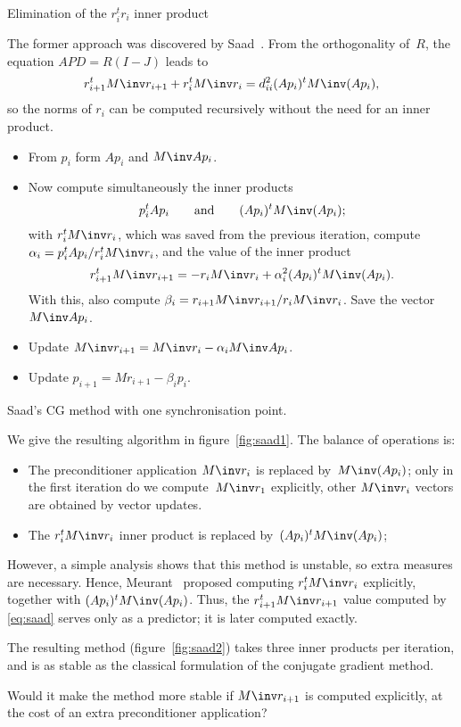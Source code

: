 \documentclass[11pt]{artikel3}
\begin{document}
\begin{Outline}
 {Elimination of the $r_i^tr_i$ inner product}
\label{sec:elim-rr}

The former approach was discovered by Saad~\cite{Sa:practicalKrylov}.
From the orthogonality of~$R$, the equation $APD=R(I-J)$ leads to
\begin{equation}
        r_{i+1}^tM\inv r_{i+1}+r_i^tM\inv r_i=d_{ii}^2(Ap_i)^tM\inv (Ap_i),
        \label{eq:saad}\end{equation}
so the norms of $r_i$ can be computed recursively without the need
for an inner product.
\begin{rfigure}
\begin{itemize}
\item From $p_i$ form $Ap_i$ and $M\inv Ap_i$.
\item Now compute simultaneously the inner products
\[p_i^tAp_i \qquad\hbox{and}\qquad (Ap_i)^tM\inv (Ap_i);\]
with $r_i^tM\inv r_i$, which was saved from the previous iteration, 
compute $\alpha_i = p_i^tAp_i/r_i^tM\inv r_i$,
and the value of the inner product 
\[r_{i+1}^tM\inv r_{i+1}=-r_iM\inv r_i +\alpha_i^2(Ap_i)^tM\inv (Ap_i).\]
With this, also compute $\beta_i=r_{i+1}M\inv r_{i+1}/r_iM\inv r_i$.
Save the vector $M\inv Ap_i$.
\item Update $M\inv r_{i+1}=M\inv r_i-\alpha_i M\inv Ap_i$.
\item Update $p_{i+1}=Mr_{i+1}-\beta_ip_i$.
\end{itemize}
\caption{Saad's CG method with one synchronisation point.}
\label{fig:saad1}
\end{rfigure}
We give the resulting algorithm in figure~\ref{fig:saad1}.
The balance of operations is:
\begin{itemize}
\item The preconditioner application $M\inv r_i$ is replaced 
by~$M\inv (Ap_i)$; only in the first iteration do we compute~$M\inv r_1$
explicitly, other $M\inv r_i$ vectors are obtained by vector updates.
\item The $r_i^tM\inv r_i$ inner product is replaced by~$(Ap_i)^tM\inv (Ap_i)$;
\end{itemize}

However, a simple analysis 
shows that this
method is unstable, so extra measures are necessary.
Hence, Meurant~\cite{Me:multicg} proposed computing $r_i^tM\inv r_i$
explicitly, together with $(Ap_i)^tM\inv(Ap_i)$. 
Thus, the $r_{i+1}^tM\inv r_{i+1}$ value computed by \eqref{eq:saad}
serves only as a predictor; it is later computed exactly.

The resulting method (figure~\ref{fig:saad2}) takes three inner products
per iteration, and is as stable as the classical formulation of
the conjugate gradient method.
\begin{question}
Would it make the method more stable if $M\inv r_{i+1}$ is computed
explicitly, at the cost of an extra preconditioner application?
\end{question}


\end{Outline}
\end{document}
